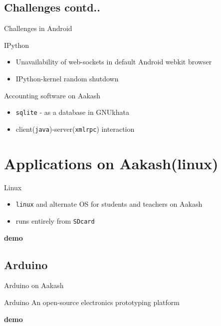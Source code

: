 \documentclass{beamer}
\begin{document}
  \subsection{Challenges contd..}
  \begin{frame}{Challenges in Android}
    \begin{block}{IPython}
      \begin{itemize}
        \item Unavailability of web-sockets in default Android webkit
          browser
        \item IPython-kernel random shutdown
      \end{itemize}
    \end{block}
    \begin{block}{Accounting software on Aakash}
      \begin{itemize}
        \item {\tt sqlite} - as a database in GNUkhata
        \item client({\tt java})-server({\tt xmlrpc}) interaction
      \end{itemize}
    \end{block}
  \end{frame}

\section{Applications on Aakash(linux)}
\begin{frame}{Linux}
  \begin{block}{}
    \begin{itemize}
    \item {\tt linux} and alternate OS for students and teachers
      on Aakash
    \item runs entirely from {\tt SDcard}
    \end{itemize}
  \end{block}
  \vskip 1cm
  \centerline {\bf demo}
\end{frame}

\subsection{Arduino}
\begin{frame}{Arduino on Aakash}
  \begin{block}{Arduino}
    An open-source electronics prototyping platform
  \end{block}
  \centerline {\bf demo}
\end{frame}
\end{document}
